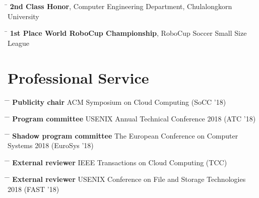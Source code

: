 \documentclass[10pt]{article} %
\begin{document}
\begin{tabbing}
\hspace{2.5cm} \=  \> \textbf{2nd Class Honor}, Computer Engineering Department, Chulalongkorn University
\end{tabbing}

\begin{tabbing}
\hspace{2.5cm} \=  \> \textbf{1st Place World RoboCup Championship}, RoboCup Soccer Small Size League
\end{tabbing}


\section{Professional Service}

\begin{tabbing}
\hspace{2.5cm} \= \hspace{4.5cm}  \=  \> \textbf{Publicity chair} \> ACM Symposium on Cloud Computing (SoCC '18)
\end{tabbing}

\begin{tabbing}
\hspace{2.5cm} \= \hspace{4.5cm}  \=  \> \textbf{Program committee} \> USENIX Annual Technical Conference 2018 (ATC '18)
\end{tabbing}

\begin{tabbing}
\hspace{2.5cm} \= \hspace{4.5cm}  \=  \> \textbf{Shadow program committee} \> The European Conference on Computer Systems 2018 (EuroSys '18)
\end{tabbing}

\begin{tabbing}
\hspace{2.5cm} \= \hspace{4.5cm}  \=  \> \textbf{External reviewer} \> IEEE Transactions on Cloud Computing (TCC)
\end{tabbing}

\begin{tabbing}
\hspace{2.5cm} \= \hspace{4.5cm}  \=  \> \textbf{External reviewer} \> USENIX Conference on File and Storage Technologies 2018 (FAST '18)
\end{tabbing}
\end{document}

